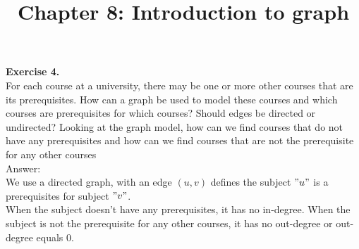 \documentclass[10pt]{article}
\begin{document}
\pagestyle{fancyplain}
\title{Chapter 8: Introduction to graph}

	\textbf{Exercise 4.} \\
For each course at a university, there may be one or more other courses that are its prerequisites. How can a graph be used to model these courses and which courses are prerequisites for which courses? Should edges be directed or undirected? Looking at the graph model, how can we find courses that do not have any prerequisites and how can we find courses that are not the prerequisite for any other courses\\
Answer:\\
We use a directed graph, with an edge $(u,v)$ defines the subject $"u"$ is a prerequisites for subject $"v"$.\\
When the subject doesn't have any prerequisites, it has no in-degree. When the subject is not the prerequisite for any other courses, it has no out-degree or out-degree equals 0.\\
\end{document}
